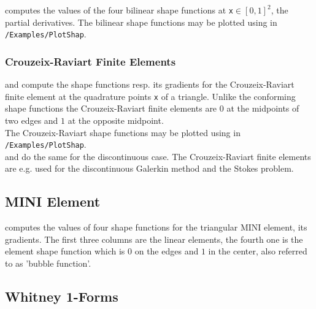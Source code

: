   computes the values of the four bilinear shape functions at \texttt{x}$\in [0,1]^2$,  the partial derivatives. The bilinear shape functions may be plotted using  in {\tt /Examples/PlotShap}.


\subsubsection{Crouzeix-Raviart Finite Elements} 

  and  compute the shape functions resp. its gradients for the Crouzeix-Raviart finite element at the quadrature points \texttt{x} of a triangle. %
 Unlike the conforming shape functions the Crouzeix-Raviart finite elements are $0$ at the midpoints of two edges and $1$ at the opposite midpoint. \\

 The Crouzeix-Raviart shape functions may be plotted using  in {\tt /Examples/PlotShap}. \\

  and  do the same for the discontinuous case. The Crouzeix-Raviart finite elements are e.g. used for the discontinuous Galerkin method and the Stokes problem.



\subsection{MINI Element} 

  computes the values of four shape functions for the triangular MINI element,  its gradients. The first three columns are the linear elements, the fourth one is the element shape function which is $0$ on the edges and $1$ in the center, also referred to as 'bubble function'.



\subsection{Whitney 1-Forms} \label{ssect:shap_W1F}  

